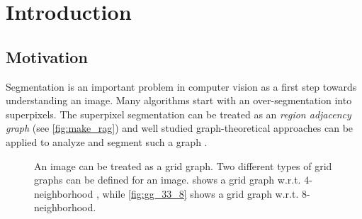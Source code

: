 \chapter{Introduction}\label{main_introduction}


\section{Motivation}
Segmentation is an important problem in computer vision as a first step
towards understanding an image. Many algorithms start with an over-segmentation
into superpixels.
The superpixel segmentation can be treated as an \emph{region adjacency graph} (see \cref{fig:make_rag}) and
well studied graph-theoretical approaches can be applied to analyze and segment such a graph \cite{vlachos_1993_csv}.

\begin{figure}
  \begin{center}
  \hspace{1cm}
  \hspace{1cm}
  \end{center}
  \caption{
  An image  can be treated as a grid graph. 
  Two different types of grid graphs can be defined for an image.
   shows a grid graph w.r.t. 4-neighborhood , while
  \cref{fig:gg_33_8} shows a grid graph w.r.t. 8-neighborhood.  
  }\label{fig:grid_graph}
\end{figure}

